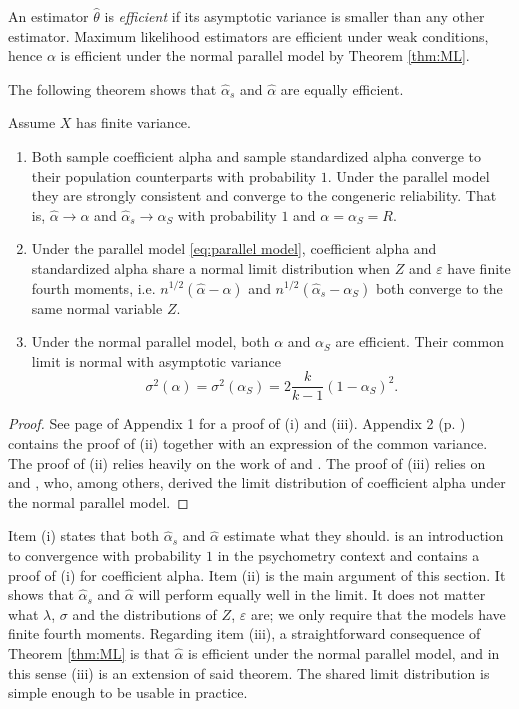 \documentclass[twoside]{article}
\begin{document}
An estimator $\hat{\theta}$ is \textit{efficient} \citep[][Section 4.3]{Lehmann2004-ke} if its asymptotic variance is smaller than any other estimator. Maximum likelihood estimators are efficient under weak conditions, hence $\alpha$ is efficient under the normal parallel model by Theorem \ref{thm:ML}.  

The following theorem shows that $\hat{\alpha}_s$ and $\hat{\alpha}$ are equally efficient.

\begin{thm}
\label{thm:asymptotics}
Assume $X$ has finite variance. 
\begin{enumerate}[label=(\roman*)]
    \item Both sample coefficient alpha and sample standardized alpha converge to their population counterparts with probability $1$. Under the parallel model they are strongly consistent and converge to the congeneric reliability. That is, $\hat{\alpha}\to\alpha$ and $\hat{\alpha}_s\to\alpha_S$ with probability $1$ and $\alpha = \alpha_S =  R$.
    \item Under the parallel model \eqref{eq:parallel model}, coefficient alpha and standardized alpha share a normal limit distribution when $Z$ and $\varepsilon$ have finite fourth moments, i.e. $n^{1/2}(\hat{\alpha} - \alpha)$ and  $n^{1/2}(\hat{\alpha}_s - \alpha_S)$ both converge to the same normal variable $Z$.
    \item Under the normal parallel model, both $\alpha$ and $\alpha_S$ are efficient. Their common limit is normal with asymptotic variance 
    $$\sigma^{2}(\alpha)= \sigma^{2}(\alpha_S)=2\frac{k}{k-1}(1-\alpha_S)^{2}.$$
\end{enumerate}
\end{thm}    
\begin{proof}
See page \pageref{proof:asymptotics} of Appendix 1 for a proof of (i) and (iii). Appendix 2 (p. \pageref{Appendix 2}) contains the proof of (ii) together with an expression of the common variance. The proof of (ii) relies heavily on the work of \citet{Van_Zyl2000-si} and \citet{hayashi2005note}. The proof of (iii) relies on \citet[][eq. 13]{Van_Zyl2000-si} and \citet[][eq. 58]{Kristof1963-tb}, who, among others, derived the limit distribution of coefficient alpha under the normal parallel model.
\end{proof}

\begin{rem}
Item (i) states that both $\hat{\alpha}_s$ and $\hat{\alpha}$ estimate what they should. \citet{Raykov2019-tv} is an introduction to convergence with probability $1$ in the psychometry context and contains a proof of (i) for coefficient alpha. Item (ii) is the main argument of this section. It shows that $\hat{\alpha}_{s}$ and $\hat{\alpha}$ will perform equally well in the limit. It does not matter what $\lambda$, $\sigma$ and the distributions of $Z$, $\varepsilon$ are; we only require that the models have finite fourth moments. Regarding item (iii), a straightforward consequence of Theorem \ref{thm:ML} is that $\hat{\alpha}$ is efficient under the normal parallel model, and in this sense (iii) is an extension of said theorem. The shared limit distribution is simple enough to be usable in practice.
\end{rem}
\end{document}
